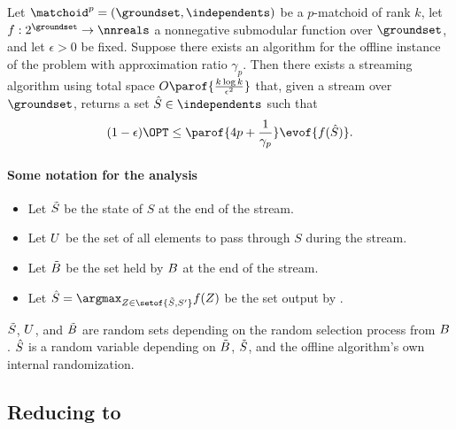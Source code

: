 \documentclass[oneside,letterpaper]{scrartcl} \usepackage{macros}
\newcommand{\mindex}{\ell}
\newcommand{\pmatchoid}{\matchoid^p} \newcommand{\defpmatchoid}{\pmatchoid = (\groundset,\independents)} \newcommand{\matroidI}{\matroid_{\mindex}} \newcommand{\groundsetI}{\groundset_{\mindex}} \newcommand{\independentsI}{\independents_{\mindex}} \newcommand{\defmatroidI}{\matroidI = (\groundsetI,\independentsI)} \newcommand{\offlineratio}{\gamma_p} \newcommand{\optset}{T^*}
\begin{document}
\begin{theorem}
  Let $\pmatchoid = (\groundset,\independents)$ be a $p$-matchoid of
  rank $k$, let $f: 2^{\groundset} \to \nnreals$ a nonnegative
  submodular function over $\groundset$, and let $\epsilon > 0$ be
  fixed. Suppose there exists an algorithm for the offline instance of
  the problem with approximation ratio $\gamma_p$. Then there exists a
  streaming algorithm using total space
  \begin{math}
    O\parof{\frac{k \log k}{\epsilon^2}}
  \end{math} that, given a stream over $\groundset$, returns a set $\bestset \in
  \independents$ such that
  \begin{align*}
    (1 - \epsilon) \OPT \leq \parof{4 p + \frac{1}{\offlineratio}}
    \evof{f(\bestset)}.
  \end{align*}
\end{theorem}




\paragraph{Some notation for the analysis}

\begin{itemize}
\item Let $\tilde{S}$ be the state of $S$ at the end of the stream.
\item Let $U$ be the set of all elements to pass through $S$
  during the stream.
\item Let $\tilde{B}$ be the set held by $B$ at the end of
  the stream.
\item Let $\bestset = \argmax_{Z \in \setof{\finalset,S'}} f(Z)$ be
  the set output by .
\end{itemize}
$\tilde{S}$, $U$, and $\tilde{B}$ are random sets depending
on the random selection process from $B$. $\hat{S}$ is a random
variable depending on $\tilde{B}$, $\tilde{S}$, and the offline
algorithm's own internal randomization.


\subsection{Reducing to }
\end{document}
